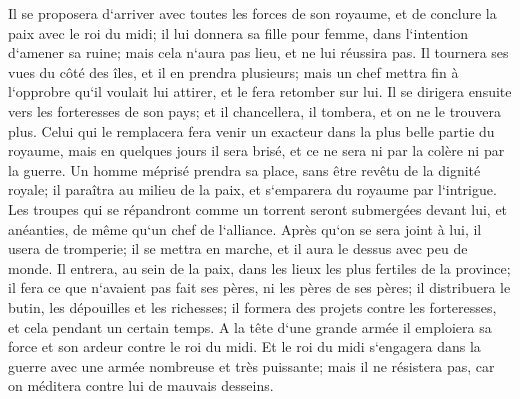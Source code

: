 \verse Il se proposera d`arriver avec toutes les forces de son royaume, et de conclure la paix avec le roi du midi; il lui donnera sa fille pour femme, dans l`intention d`amener sa ruine; mais cela n`aura pas lieu, et ne lui réussira pas. 
\verse Il tournera ses vues du côté des îles, et il en prendra plusieurs; mais un chef mettra fin à l`opprobre qu`il voulait lui attirer, et le fera retomber sur lui. 
\verse Il se dirigera ensuite vers les forteresses de son pays; et il chancellera, il tombera, et on ne le trouvera plus. 
\verse Celui qui le remplacera fera venir un exacteur dans la plus belle partie du royaume, mais en quelques jours il sera brisé, et ce ne sera ni par la colère ni par la guerre. 
\verse Un homme méprisé prendra sa place, sans être revêtu de la dignité royale; il paraîtra au milieu de la paix, et s`emparera du royaume par l`intrigue. 
\verse Les troupes qui se répandront comme un torrent seront submergées devant lui, et anéanties, de même qu`un chef de l`alliance. 
\verse Après qu`on se sera joint à lui, il usera de tromperie; il se mettra en marche, et il aura le dessus avec peu de monde. 
\verse Il entrera, au sein de la paix, dans les lieux les plus fertiles de la province; il fera ce que n`avaient pas fait ses pères, ni les pères de ses pères; il distribuera le butin, les dépouilles et les richesses; il formera des projets contre les forteresses, et cela pendant un certain temps. 
\verse A la tête d`une grande armée il emploiera sa force et son ardeur contre le roi du midi. Et le roi du midi s`engagera dans la guerre avec une armée nombreuse et très puissante; mais il ne résistera pas, car on méditera contre lui de mauvais desseins. 
